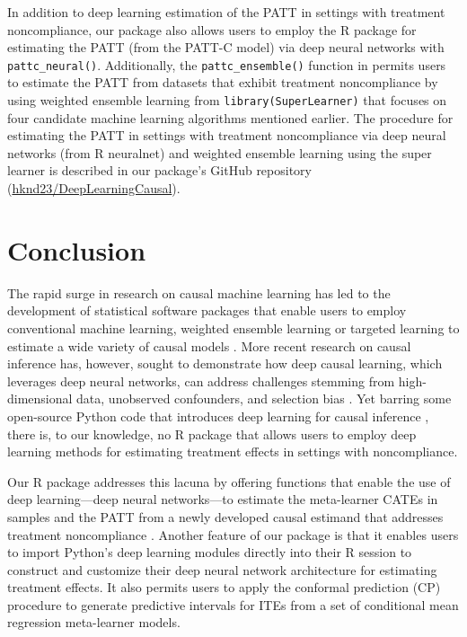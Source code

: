In addition to deep learning estimation of the PATT in settings with
treatment noncompliance, our  package also
allows users to employ the R  package for estimating the
PATT (from the PATT-C model) via deep neural networks with
\texttt{pattc\_neural()}. Additionally, the \texttt{pattc\_ensemble()} function in
 permits users to estimate the PATT from
datasets that exhibit treatment noncompliance by using weighted ensemble
learning from \texttt{library(SuperLearner)} that focuses on four candidate
machine learning algorithms mentioned earlier. The procedure for
estimating the PATT in settings with treatment noncompliance via deep
neural networks (from R neuralnet) and weighted ensemble learning using
the super learner is described in our package's GitHub repository
(\href{https://github.com/hknd23/DeepLearningCausal}{hknd23/DeepLearningCausal}).

\section{Conclusion}\label{conclusion}

The rapid surge in research on causal machine learning has led to the
development of statistical software packages that enable users to employ
conventional machine learning, weighted ensemble learning or targeted
learning to estimate a wide variety of causal models \citep[e.g.,][]{vanderlaan2011targeted, nie2021quasi, knaus2022causalDML, Hu2022, zhao2023causalML}. More recent research on causal inference has,
however, sought to demonstrate how deep causal learning, which leverages
deep neural networks, can address challenges stemming from
high-dimensional data, unobserved confounders, and selection bias
\citep{goodfellow2016deep, Li2024survey, koch2024deepcausal}. Yet barring
some open-source Python code that introduces deep learning for causal
inference \citep{koch2024deepcausal}, there is, to our knowledge, no R
package that allows users to employ deep learning methods for estimating
treatment effects in settings with noncompliance.

Our R package addresses this lacuna by offering functions that enable
the use of deep learning---deep neural networks---to estimate the
meta-learner CATEs in samples and the PATT from a newly developed causal
estimand that addresses treatment noncompliance \citep{Kunzel2019meta, ottoboni2020PATT}. Another feature of our package is that it enables
users to import Python's deep learning modules directly into their R
session to construct and customize their deep neural network
architecture for estimating treatment effects. It also permits users to
apply the conformal prediction (CP) procedure to generate predictive
intervals for ITEs from a set of conditional mean regression
meta-learner models.

